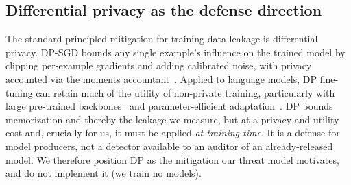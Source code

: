 \subsection{Differential privacy as the defense direction}
\label{sec:dp}
The standard principled mitigation for training-data leakage is differential privacy.
DP-SGD bounds any single example's influence on the trained model by clipping per-example
gradients and adding calibrated noise, with privacy accounted via the moments
accountant~\citep{abadi2016deep}. Applied to language models, DP fine-tuning can retain
much of the utility of non-private training, particularly with large pre-trained
backbones~\citep{li2022dpllm} and parameter-efficient adaptation~\citep{yu2022dpfinetuning}.
DP bounds memorization and thereby the leakage we measure, but at a privacy and utility cost
and, crucially for us, it must be applied \emph{at training time}. It is a defense for
model producers, not a detector available to an auditor of an already-released model. We
therefore position DP as the mitigation our threat model motivates, and do not implement
it (we train no models).


